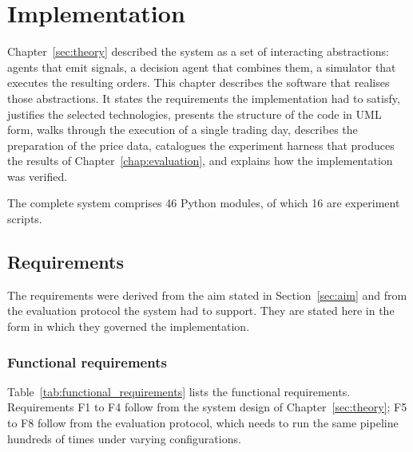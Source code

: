 \chapter{Implementation}\label{chap:implementation}

Chapter~\ref{sec:theory} described the system as a set of interacting abstractions: agents that emit signals, a decision agent that combines them, a simulator that executes the resulting orders. This chapter describes the software that realises those abstractions. It states the requirements the implementation had to satisfy, justifies the selected technologies, presents the structure of the code in UML form, walks through the execution of a single trading day, describes the preparation of the price data, catalogues the experiment harness that produces the results of Chapter~\ref{chap:evaluation}, and explains how the implementation was verified.

The complete system comprises 46 Python modules, of which 16 are experiment scripts.

\section{Requirements}\label{sec:requirements}

The requirements were derived from the aim stated in Section~\ref{sec:aim} and from the evaluation protocol the system had to support. They are stated here in the form in which they governed the implementation.

\subsection{Functional requirements}\label{subsec:functional_requirements}

Table~\ref{tab:functional_requirements} lists the functional requirements. Requirements F1 to F4 follow from the system design of Chapter~\ref{sec:theory}; F5 to F8 follow from the evaluation protocol, which needs to run the same pipeline hundreds of times under varying configurations.


